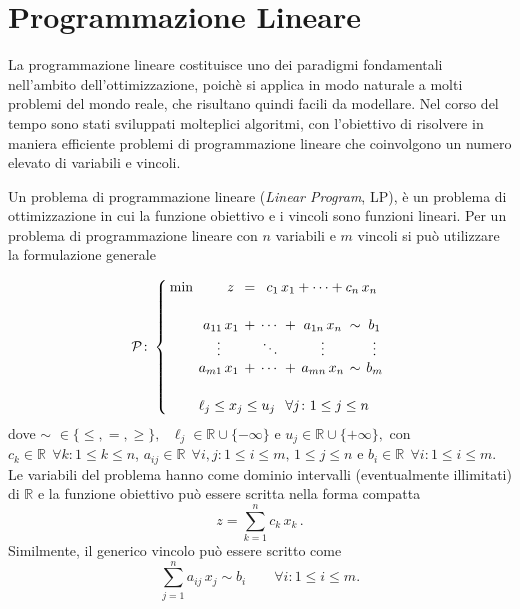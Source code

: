 \section{Programmazione Lineare}
La programmazione lineare costituisce uno dei paradigmi fondamentali nell'ambito dell'ottimizzazione, poichè si applica
in modo naturale a molti problemi del mondo reale, che risultano quindi facili da modellare. Nel corso del tempo sono
stati sviluppati molteplici algoritmi, con l'obiettivo di risolvere in maniera efficiente problemi di programmazione
lineare che coinvolgono un numero elevato di variabili e vincoli.

Un problema di programmazione lineare (\textit{Linear Program}, LP), è un problema di ottimizzazione in cui la funzione
obiettivo e i vincoli sono funzioni lineari. Per un problema di programmazione lineare con \( n \) variabili e \( m \)
vincoli si può utilizzare la formulazione generale

\begin{equation}
\mathcal{P}\colon
\setlength{\arraycolsep}{2pt}
\left\{\begin{array}{rrcccccc}
\min & z\,\, &=& \multicolumn{5}{c}{c_{1}\,x_{1}+\cdots+c_{n}\,x_{n}} \\[15pt]
     &  a_{11}\,x_{1} &+ &\cdots &+ &a_{1n}\,x_{n} &\sim &b_{1}       \\
     & \multicolumn{1}{c}{\vdots} &&\ddots&&\vdots&& \vdots           \\
     &  a_{m1}\,x_{1} &+ &\cdots &+ &a_{mn}\,x_{n} &\sim &b_{m}       \\[15pt]
     & \multicolumn{7}{l}{\ell_j \le x_{j} \le u_{j} \;\;\, \forall j\colon
     1 \le j \le n}
\end{array}\right.\\[10pt]
\end{equation}
dove
\(
\sim \,\,\in \{ \leq, =, \geq \}, \text{ } \ell_j \in \mathbb{R} \cup \{-\infty\} \text{ e } u_j \in \mathbb{R} \cup
\{+\infty\},
\)
con \( c_k \in \mathbb{R} \;\, \forall k\colon 1 \leq k \leq n \), \( a_{ij} \in \mathbb{R} \;\, \forall i,j\colon 1
\leq i \leq m,\, 1 \leq j \leq n \) e \( b_i \in \mathbb{R}\;\, \forall i\colon 1 \leq i \leq m \). Le variabili del
problema hanno come dominio intervalli (eventualmente illimitati) di \( \mathbb{R} \) e la funzione obiettivo può essere
scritta nella forma compatta
\begin{equation}
    z = \sum_{k = 1}^n c_k\,x_k\,.
\end{equation}
Similmente, il generico vincolo può essere scritto come
\begin{equation}
    \sum_{j = 1}^n a_{ij}\, x_j \sim b_i \qquad \forall i\colon 1 \leq i \leq m.
\end{equation}

